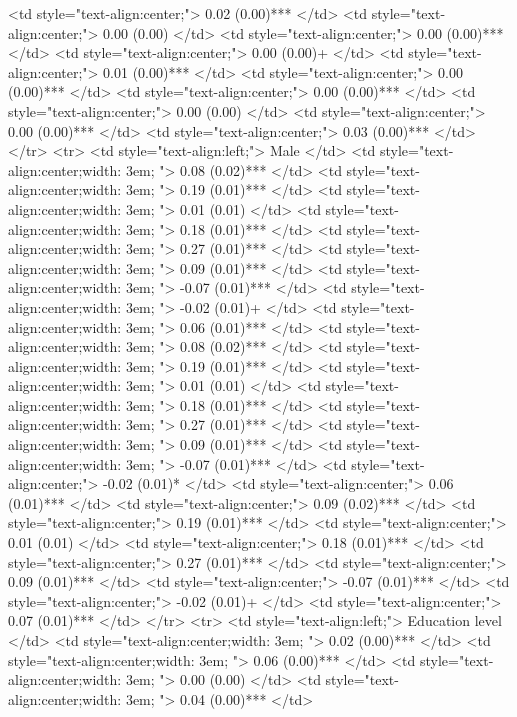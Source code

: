    <td style="text-align:center;"> 0.02 (0.00)*** </td>
   <td style="text-align:center;"> 0.00 (0.00) </td>
   <td style="text-align:center;"> 0.00 (0.00)*** </td>
   <td style="text-align:center;"> 0.00 (0.00)+ </td>
   <td style="text-align:center;"> 0.01 (0.00)*** </td>
   <td style="text-align:center;"> 0.00 (0.00)*** </td>
   <td style="text-align:center;"> 0.00 (0.00)*** </td>
   <td style="text-align:center;"> 0.00 (0.00) </td>
   <td style="text-align:center;"> 0.00 (0.00)*** </td>
   <td style="text-align:center;"> 0.03 (0.00)*** </td>
  </tr>
  <tr>
   <td style="text-align:left;"> Male </td>
   <td style="text-align:center;width: 3em; "> 0.08 (0.02)*** </td>
   <td style="text-align:center;width: 3em; "> 0.19 (0.01)*** </td>
   <td style="text-align:center;width: 3em; "> 0.01 (0.01) </td>
   <td style="text-align:center;width: 3em; "> 0.18 (0.01)*** </td>
   <td style="text-align:center;width: 3em; "> 0.27 (0.01)*** </td>
   <td style="text-align:center;width: 3em; "> 0.09 (0.01)*** </td>
   <td style="text-align:center;width: 3em; "> -0.07 (0.01)*** </td>
   <td style="text-align:center;width: 3em; "> -0.02 (0.01)+ </td>
   <td style="text-align:center;width: 3em; "> 0.06 (0.01)*** </td>
   <td style="text-align:center;width: 3em; "> 0.08 (0.02)*** </td>
   <td style="text-align:center;width: 3em; "> 0.19 (0.01)*** </td>
   <td style="text-align:center;width: 3em; "> 0.01 (0.01) </td>
   <td style="text-align:center;width: 3em; "> 0.18 (0.01)*** </td>
   <td style="text-align:center;width: 3em; "> 0.27 (0.01)*** </td>
   <td style="text-align:center;width: 3em; "> 0.09 (0.01)*** </td>
   <td style="text-align:center;width: 3em; "> -0.07 (0.01)*** </td>
   <td style="text-align:center;"> -0.02 (0.01)* </td>
   <td style="text-align:center;"> 0.06 (0.01)*** </td>
   <td style="text-align:center;"> 0.09 (0.02)*** </td>
   <td style="text-align:center;"> 0.19 (0.01)*** </td>
   <td style="text-align:center;"> 0.01 (0.01) </td>
   <td style="text-align:center;"> 0.18 (0.01)*** </td>
   <td style="text-align:center;"> 0.27 (0.01)*** </td>
   <td style="text-align:center;"> 0.09 (0.01)*** </td>
   <td style="text-align:center;"> -0.07 (0.01)*** </td>
   <td style="text-align:center;"> -0.02 (0.01)+ </td>
   <td style="text-align:center;"> 0.07 (0.01)*** </td>
  </tr>
  <tr>
   <td style="text-align:left;"> Education level </td>
   <td style="text-align:center;width: 3em; "> 0.02 (0.00)*** </td>
   <td style="text-align:center;width: 3em; "> 0.06 (0.00)*** </td>
   <td style="text-align:center;width: 3em; "> 0.00 (0.00) </td>
   <td style="text-align:center;width: 3em; "> 0.04 (0.00)*** </td>
